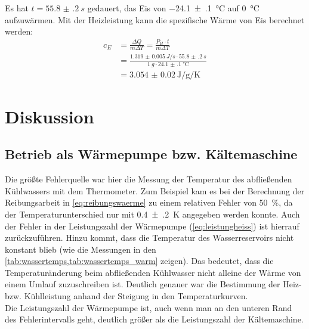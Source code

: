 Es hat $t=\SI{55.8(2)}{s}$ gedauert, das Eis von \SI{-24.1(1)}{\degreeCelsius} auf \SI{0}{\degreeCelsius} aufzuwärmen. Mit der Heizleistung kann die spezifische Wärme von Eis berechnet werden:
\begin{align}
	c_E&=\frac{\Delta Q}{m\Delta T}=\frac{P_H\cdot t}{m\Delta T}\\
	&=\frac{\SI{1.319(5)}{J/s}\cdot \SI{55.8(2)}{s}}{\SI{1}{g}\cdot \SI{24.1(1)}{\degreeCelsius}}\\
	&=\SI{3.054(20)}{\joule\per\g\per\kelvin}
\label{eq:eisspez}
\end{align}

\newpage
{}
\section{Diskussion}
\subsection{Betrieb als Wärmepumpe bzw. Kältemaschine}
Die größte Fehlerquelle war hier die Messung der Temperatur des abfließenden Kühlwassers mit dem Thermometer. Zum Beispiel kam es bei der Berechnung der Reibungsarbeit in \cref{eq:reibungswaerme} zu einem relativen Fehler von \SI{50}{\percent}, da der Temperaturunterschied nur mit \SI{0.4(2)}{K} angegeben werden konnte. Auch der Fehler in der Leistungszahl der Wärmepumpe (\cref{eq:leistungheiss}) ist hierrauf zurückzuführen. Hinzu kommt, dass die Temperatur des Wasserreservoirs nicht konstant blieb (wie die Messungen in den \cref{tab:wassertemps,tab:wassertemps_warm} zeigen). Das bedeutet, dass die Temperaturänderung beim abfließenden Kühlwasser nicht alleine der Wärme von einem Umlauf zuzuschreiben ist.
Deutlich genauer war die Bestimmung der Heiz- bzw. Kühlleistung anhand der Steigung in den Temperaturkurven.\\

Die Leistungszahl der Wärmepumpe ist, auch wenn man an den unteren Rand des Fehlerintervalls geht, deutlich größer als die Leistungszahl der Kältemaschine.
